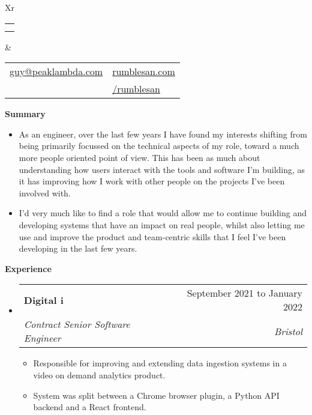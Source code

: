 \documentclass[letterpaper,12pt]{article}[leftmargin=*]
\makeatletter
\def \fullname {David Guy John}
\def \subtitle {}
\def \phoneicon {\faPhone}
\def \phonetext {07531 668 965}
\def \emailicon {\faEnvelope}
\def \emaillink {mailto:guy@peaklambda.com}
\def \emailtext {guy@peaklambda.com}
\def \githubicon {\faGithub}
\def \githublink {https://github.com/rumblesan}
\def \githubtext {/rumblesan}
\def \websiteicon {\faGlobe}
\def \websitelink {https://rumblesan.com/}
\def \websitetext {rumblesan.com}
\def \entryspacing {-0pt}
\def \phone {\phoneicon \hspace{3pt}{ \phonetext}}
\def \email {\emailicon \hspace{3pt}\href{\emaillink}{\emailtext}}
\def \github {\githubicon \hspace{3pt}\href{\githublink}{\githubtext}}
\def \website {\websiteicon \hspace{3pt}\href{\websitelink}{\websitetext}}
\renewcommand{\section}[2]{\vspace{5pt}
  \colorbox{secondary}{\color{white}\raggedbottom\normalsize{#1}{\hspace{7pt}\textbf{#2}}}
}
\newenvironment{resumeEntry}[0]{
  \begin{itemize}[leftmargin=2.5mm]
  }{
  \end{itemize}\vspace{\entryspacing}
}
\newenvironment{resumeItemList}[0]{
  \begin{itemize}[leftmargin=4.5mm]
  }{
  \end{itemize}
}
\newcommand{\resumeItem}[1]{
  \item\small{
    {#1 \vspace{-2pt}}
  }
}
\newcommand{\resumeEntryTSDL}[4]{
  \vspace{-1pt}\item[]
    \begin{tabularx}{0.97\textwidth}{X@{\hspace{60pt}}r}
      \textbf{\color{primary}#1} & {\firabook\color{accent}\small#2} \\
      \textit{\color{accent}\small#3} & \textit{\color{accent}\small#4} \\
    \end{tabularx}\vspace{-6pt}
}
\newcommand{\cvHeader}[4]{
  \begin{tabularx}{\textwidth}{Xr}
    {
      \begin{tabular}{l}
        \fontsize{35}{45}\selectfont{\color{primary}{{\textbf{\fullname}}}} \\
        {\textit{\subtitle}}
      \end{tabular}
    } & {
      \begin{tabular}{l@{\hspace{1.5em}}l}
        {\small#1} & {\small#3} \\
        {\small#2} & {\small#4}
      \end{tabular}
    }
  \end{tabularx}
}
\makeatother
\begin{document}


\cvHeader{\email}{\phone}{\website}{\github} %
\vspace{-10pt} %


\section{\faInfo}{Summary}

  \begin{resumeEntry}
    \item[]{As an engineer, over the last few years I have found my interests shifting from being primarily focussed on the technical aspects of my role, toward a much more people oriented point of view. This has been as much about understanding how users interact with the tools and software I'm building, as it has improving how I work with other people on the projects I've been involved with.}
    \item[]{I'd very much like to find a role that would allow me to continue building and developing systems that have an impact on real people, whilst also letting me use and improve the product and team-centric skills that I feel I've been developing in the last few years.}
  \end{resumeEntry}

\section{\faPieChart}{Experience}

  \begin{resumeEntry}
    \resumeEntryTSDL{Digital i}{September 2021 to January 2022}
      {Contract Senior Software Engineer}{Bristol}
    \begin{resumeItemList}
      \resumeItem{Responsible for improving and extending data ingestion systems in a video on demand analytics product.}
      \resumeItem{System was split between a Chrome browser plugin, a Python API backend and a React frontend.}
    \end{resumeItemList}
  \end{resumeEntry}
\end{document}
